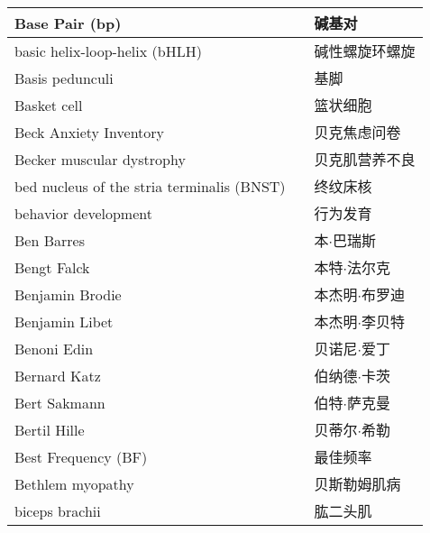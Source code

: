 \begin{longtable}{lll}
	\midrule
	Base Pair (bp)  && 碱基对  \\
	
	\midrule
	basic helix-loop-helix (bHLH)  && 碱性螺旋环螺旋  \\
	
	\midrule
	Basis pedunculi   && 基脚  \\
	
	\midrule
	Basket cell   && 篮状细胞  \\
	
	\midrule
	Beck Anxiety Inventory   && 贝克焦虑问卷  \\
	
	\midrule
	Becker muscular dystrophy   && 贝克肌营养不良  \\
	
	\midrule
	bed nucleus of the stria terminalis (BNST)  && 终纹床核  \\
	
	\midrule
	behavior development && 行为发育  \\
	
	\midrule
	Ben Barres   && 本$\cdot$巴瑞斯  \\
	
	\midrule
	Bengt Falck   && 本特$\cdot$法尔克  \\
	
	\midrule
	Benjamin Brodie   && 本杰明$\cdot$布罗迪  \\
	
	\midrule
	Benjamin Libet   && 本杰明$\cdot$李贝特  \\
	
	\midrule
	Benoni Edin   && 贝诺尼$\cdot$爱丁  \\
	
	\midrule
	Bernard Katz   && 伯纳德$\cdot$卡茨  \\
	
	\midrule
	Bert Sakmann   && 伯特$\cdot$萨克曼  \\
	
	\midrule
	Bertil Hille   && 贝蒂尔$\cdot$希勒  \\
 
	\midrule
	Best Frequency (BF)     && 最佳频率   \\
	
	\midrule
	Bethlem myopathy     && 贝斯勒姆肌病   \\
	
	\midrule
	biceps brachii     && 	肱二头肌   \\
	

\end{longtable}
